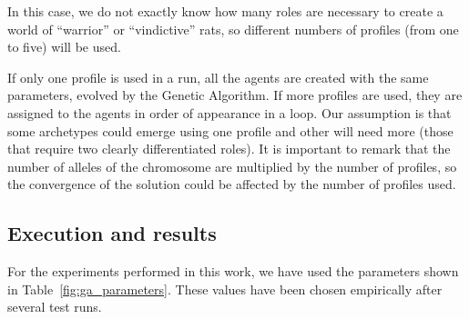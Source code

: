 \documentclass{sig-alternate}
\begin{document}

In this case,
 we do not exactly know how many roles are necessary to create a world of ``warrior'' or ``vindictive''
  rats, so different numbers of profiles (from one to five) will be used.



If only one profile is used
in a run, all the agents are created with the same parameters, evolved
by the Genetic Algorithm. If more profiles are used, they are assigned
to the agents in order of appearance in a loop. Our assumption is that
some archetypes could emerge using one profile and other will need
more (those that require two clearly differentiated roles). It is
important to remark that the number of alleles of the chromosome are
multiplied by the number of profiles, so the convergence of the
solution could be affected by the number of profiles used. 




\subsection{Execution and results}

For the experiments performed in this work, we have used the parameters shown in Table~\ref{fig:ga_parameters}. These values have been chosen empirically after several test runs.
\end{document}
